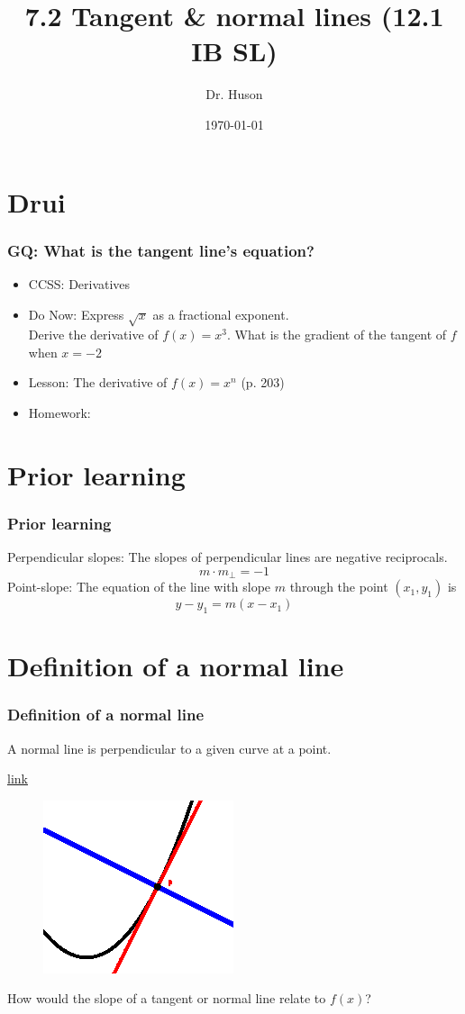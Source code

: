 \documentclass{beamer}
\title{7.2 Tangent \& normal lines (12.1 IB SL)}
\author{Dr. Huson}
\date{\today}
\begin{document}
\frame{\titlepage}

\section[Outline]{}
\frame{\tableofcontents}

\section{Drui}
\frame
{
  \frametitle{GQ: What is the tangent line's equation?}

  \begin{itemize}
  \item CCSS: Derivatives
  \item Do Now: Express $\sqrt{x}$ as a fractional exponent.\\
  Derive the derivative of $f(x)=x^3$. What is the gradient of the tangent of $f$ when $x=-2$
  \item Lesson: The derivative of $f(x)=x^n$ (p. 203)
  \item Homework:     
  \end{itemize}
}

\section{Prior learning}
\frame
{
  \frametitle{Prior learning}
  \alert{Perpendicular slopes:} The slopes of perpendicular lines are negative reciprocals.
  \[m \cdot m_{\perp} = -1\]
  \alert{Point-slope:} The equation of the line with slope $m$ through the point $(x_1,y_1)$ is 
  \[y-y_1 = m(x-x_1)\]
}

\section{Definition of a normal line}
\frame
{
  \frametitle{Definition of a normal line}
  \begin{definition}
  A \alert{normal} line is perpendicular to a given curve at a point.
  \end{definition}
  \href{https://www.geogebra.org/m/Zm97a6AJ}{link}
  \begin{figure}
    \centering
    \includegraphics[height=0.4\textheight]{7-2_tangent+normal.eps}
  \end{figure}
  How would the slope of a tangent or normal line relate to $f(x)$? 
}
\end{document}
